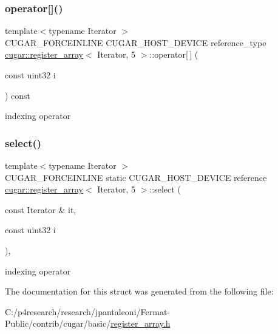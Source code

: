 \subsubsection{\texorpdfstring{operator[]()}{operator[]()}}
{\footnotesize\ttfamily template$<$typename Iterator $>$ \\
C\+U\+G\+A\+R\+\_\+\+F\+O\+R\+C\+E\+I\+N\+L\+I\+NE C\+U\+G\+A\+R\+\_\+\+H\+O\+S\+T\+\_\+\+D\+E\+V\+I\+CE reference\+\_\+type \hyperlink{structcugar_1_1register__array}{cugar\+::register\+\_\+array}$<$ Iterator, 5 $>$\+::operator\mbox{[}$\,$\mbox{]} (\begin{DoxyParamCaption}\item[{const uint32}]{i }\end{DoxyParamCaption}) const\hspace{0.3cm}{\ttfamily [inline]}}

indexing operator \mbox{\label{structcugar_1_1register__array_3_01_iterator_00_015_01_4_a506da41a58787e5f1295eb91412f61fc}} 
\subsubsection{\texorpdfstring{select()}{select()}}
{\footnotesize\ttfamily template$<$typename Iterator $>$ \\
C\+U\+G\+A\+R\+\_\+\+F\+O\+R\+C\+E\+I\+N\+L\+I\+NE static C\+U\+G\+A\+R\+\_\+\+H\+O\+S\+T\+\_\+\+D\+E\+V\+I\+CE reference \hyperlink{structcugar_1_1register__array}{cugar\+::register\+\_\+array}$<$ Iterator, 5 $>$\+::select (\begin{DoxyParamCaption}\item[{const Iterator \&}]{it,  }\item[{const uint32}]{i }\end{DoxyParamCaption})\hspace{0.3cm}{\ttfamily [inline]}, {\ttfamily [static]}}

indexing operator 

The documentation for this struct was generated from the following file\+:\begin{DoxyCompactItemize}
\item 
C\+:/p4research/research/jpantaleoni/\+Fermat-\/\+Public/contrib/cugar/basic/\hyperlink{register__array_8h}{register\+\_\+array.\+h}\end{DoxyCompactItemize}
